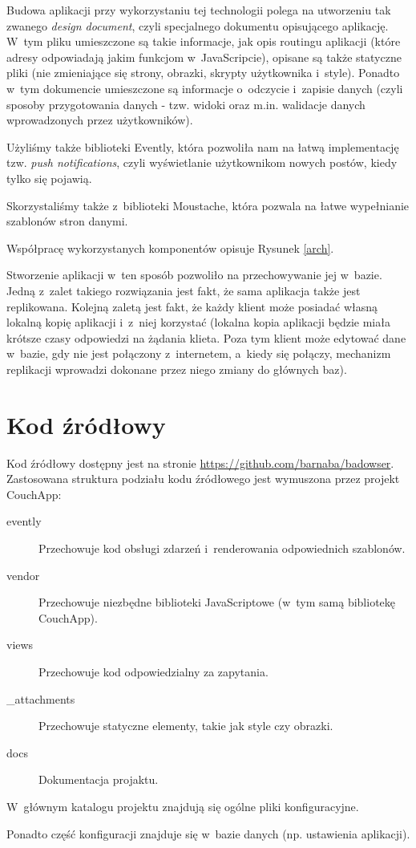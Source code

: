 \documentclass[a4paper]{article}
\begin{document}
Budowa aplikacji przy wykorzystaniu tej technologii polega na utworzeniu tak zwanego \emph{design document}, czyli specjalnego dokumentu opisującego aplikację.
W~tym pliku umieszczone są takie informacje, jak opis routingu aplikacji (które adresy odpowiadają jakim funkcjom w~JavaScripcie),
opisane są także statyczne pliki (nie zmieniające się strony, obrazki, skrypty użytkownika i~style).
Ponadto w~tym dokumencie umieszczone są informacje o~odczycie i~zapisie danych (czyli sposoby przygotowania danych - tzw. widoki oraz m.in. walidacje danych wprowadzonych przez użytkowników).

Użyliśmy także biblioteki Evently, która pozwoliła nam na łatwą implementację tzw. \emph{push notifications}, czyli wyświetlanie użytkownikom nowych postów, kiedy tylko się pojawią.

Skorzystaliśmy także z~biblioteki Moustache, która pozwala na łatwe wypełnianie szablonów stron danymi.

Współpracę wykorzystanych komponentów opisuje Rysunek \ref{arch}.

Stworzenie aplikacji w~ten sposób pozwoliło na przechowywanie jej w~bazie. Jedną z~zalet takiego rozwiązania jest fakt, że sama aplikacja także jest replikowana.
Kolejną zaletą jest fakt, że każdy klient może posiadać własną lokalną kopię aplikacji i~z~niej korzystać (lokalna kopia aplikacji będzie miała krótsze czasy odpowiedzi na żądania klieta. 
Poza tym klient może edytować dane w~bazie, gdy nie jest połączony z~internetem, a~kiedy się połączy, mechanizm replikacji wprowadzi dokonane przez niego zmiany do głównych baz).

\section{Kod źródłowy}
Kod źródłowy dostępny jest na stronie \url{https://github.com/barnaba/badowser}.
Zastosowana struktura podziału kodu źródłowego jest wymuszona przez projekt CouchApp:
\begin{description}
  \item[evently] Przechowuje kod obsługi zdarzeń i~renderowania odpowiednich szablonów.
  \item[vendor] Przechowuje niezbędne biblioteki JavaScriptowe (w~tym samą bibliotekę CouchApp).
  \item[views] Przechowuje kod odpowiedzialny za zapytania.
  \item[\_attachments] Przechowuje statyczne elementy, takie jak style czy obrazki.
  \item[docs] Dokumentacja projaktu.
\end{description}
W~głównym katalogu projektu znajdują się ogólne pliki konfiguracyjne.

Ponadto część konfiguracji znajduje się w~bazie danych (np. ustawienia aplikacji).
\end{document}
